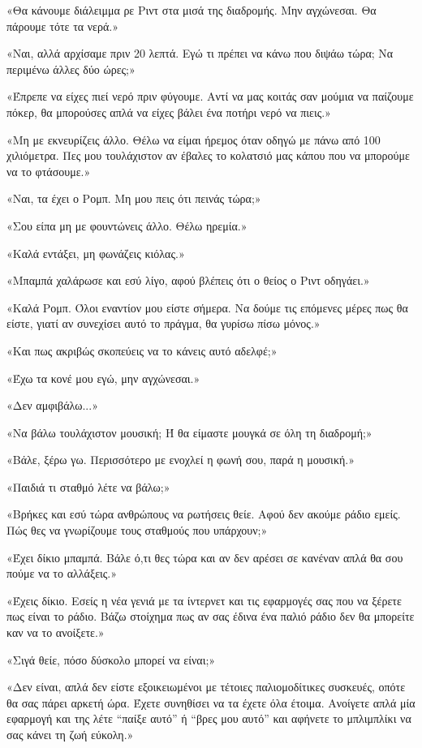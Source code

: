 \documentclass[12pt,twoside, openany]{book}
\begin{document}
«Θα κάνουμε διάλειμμα ρε Ριντ στα μισά της διαδρομής. Μην αγχώνεσαι. Θα πάρουμε τότε τα νερά.»

«Ναι, αλλά αρχίσαμε πριν 20 λεπτά. Εγώ τι πρέπει να κάνω που διψάω τώρα; Να περιμένω άλλες δύο ώρες;»

«Έπρεπε να είχες πιεί νερό πριν φύγουμε. Αντί να μας κοιτάς σαν μούμια να παίζουμε πόκερ, θα μπορούσες απλά να είχες βάλει ένα ποτήρι νερό να πιεις.»

«Μη με εκνευρίζεις άλλο. Θέλω να είμαι ήρεμος όταν οδηγώ με πάνω από 100 χιλιόμετρα. Πες μου τουλάχιστον αν έβαλες το κολατσιό μας κάπου που να μπορούμε να το φτάσουμε.»

«Ναι, τα έχει ο Ρομπ. Μη μου πεις ότι πεινάς τώρα;»

«Σου είπα μη με φουντώνεις άλλο. Θέλω ηρεμία.»

«Καλά εντάξει, μη φωνάζεις κιόλας.»

«Μπαμπά χαλάρωσε και εσύ λίγο, αφού βλέπεις ότι ο θείος ο Ριντ οδηγάει.»

«Καλά Ρομπ. Όλοι εναντίον μου είστε σήμερα. Να δούμε τις επόμενες μέρες πως θα είστε, γιατί αν συνεχίσει αυτό το πράγμα, θα γυρίσω πίσω μόνος.»

«Και πως ακριβώς σκοπεύεις να το κάνεις αυτό αδελφέ;»

«Έχω τα κονέ μου εγώ, μην αγχώνεσαι.»

«Δεν αμφιβάλω...»

«Να βάλω τουλάχιστον μουσική; Ή θα είμαστε μουγκά σε όλη τη διαδρομή;»

«Βάλε, ξέρω γω. Περισσότερο με ενοχλεί η φωνή σου, παρά η μουσική.»

«Παιδιά τι σταθμό λέτε να βάλω;»

«Βρήκες και εσύ τώρα ανθρώπους να ρωτήσεις θείε. Αφού δεν ακούμε ράδιο εμείς. Πώς θες να γνωρίζουμε τους σταθμούς που υπάρχουν;»

«Έχει δίκιο μπαμπά. Βάλε ό,τι θες τώρα και αν δεν αρέσει σε κανέναν απλά θα σου πούμε να το αλλάξεις.»

«Έχεις δίκιο. Εσείς η νέα γενιά με τα ίντερνετ και τις εφαρμογές σας που να ξέρετε πως είναι το ράδιο. Βάζω στοίχημα πως αν σας έδινα ένα παλιό ράδιο δεν θα μπορείτε καν να το ανοίξετε.»

«Σιγά θείε, πόσο δύσκολο μπορεί να είναι;»

«Δεν είναι, απλά δεν είστε εξοικειωμένοι με τέτοιες παλιομοδίτικες συσκευές, οπότε θα σας πάρει αρκετή ώρα. Έχετε συνηθίσει να τα έχετε όλα έτοιμα. Ανοίγετε απλά μία εφαρμογή και της λέτε “παίξε αυτό” ή “βρες μου αυτό” και αφήνετε το μπλιμπλίκι να σας κάνει τη ζωή εύκολη.»
\end{document}
